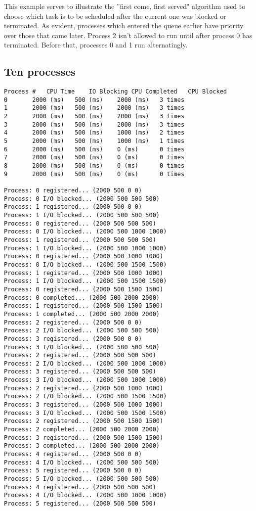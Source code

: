 \documentclass{article}
\begin{document}
	This example serves to illustrate the ''first come, first served" algorithm
	used to choose which task is to be scheduled after the current one was
	blocked or terminated. As evident, processes which entered the queue earlier
	have priority over those that came later. Process 2 isn't allowed to run
	until after process 0 has terminated. Before that, processes 0 and 1 run
	alternatingly.
	
	\subsection{Ten processes}
	
	\begin{verbatim}
Process #	CPU Time	IO Blocking	CPU Completed	CPU Blocked
0		2000 (ms)	500 (ms)	2000 (ms)	3 times
1		2000 (ms)	500 (ms)	2000 (ms)	3 times
2		2000 (ms)	500 (ms)	2000 (ms)	3 times
3		2000 (ms)	500 (ms)	2000 (ms)	3 times
4		2000 (ms)	500 (ms)	1000 (ms)	2 times
5		2000 (ms)	500 (ms)	1000 (ms)	1 times
6		2000 (ms)	500 (ms)	0 (ms)		0 times
7		2000 (ms)	500 (ms)	0 (ms)		0 times
8		2000 (ms)	500 (ms)	0 (ms)		0 times
9		2000 (ms)	500 (ms)	0 (ms)		0 times

Process: 0 registered... (2000 500 0 0)
Process: 0 I/O blocked... (2000 500 500 500)
Process: 1 registered... (2000 500 0 0)
Process: 1 I/O blocked... (2000 500 500 500)
Process: 0 registered... (2000 500 500 500)
Process: 0 I/O blocked... (2000 500 1000 1000)
Process: 1 registered... (2000 500 500 500)
Process: 1 I/O blocked... (2000 500 1000 1000)
Process: 0 registered... (2000 500 1000 1000)
Process: 0 I/O blocked... (2000 500 1500 1500)
Process: 1 registered... (2000 500 1000 1000)
Process: 1 I/O blocked... (2000 500 1500 1500)
Process: 0 registered... (2000 500 1500 1500)
Process: 0 completed... (2000 500 2000 2000)
Process: 1 registered... (2000 500 1500 1500)
Process: 1 completed... (2000 500 2000 2000)
Process: 2 registered... (2000 500 0 0)
Process: 2 I/O blocked... (2000 500 500 500)
Process: 3 registered... (2000 500 0 0)
Process: 3 I/O blocked... (2000 500 500 500)
Process: 2 registered... (2000 500 500 500)
Process: 2 I/O blocked... (2000 500 1000 1000)
Process: 3 registered... (2000 500 500 500)
Process: 3 I/O blocked... (2000 500 1000 1000)
Process: 2 registered... (2000 500 1000 1000)
Process: 2 I/O blocked... (2000 500 1500 1500)
Process: 3 registered... (2000 500 1000 1000)
Process: 3 I/O blocked... (2000 500 1500 1500)
Process: 2 registered... (2000 500 1500 1500)
Process: 2 completed... (2000 500 2000 2000)
Process: 3 registered... (2000 500 1500 1500)
Process: 3 completed... (2000 500 2000 2000)
Process: 4 registered... (2000 500 0 0)
Process: 4 I/O blocked... (2000 500 500 500)
Process: 5 registered... (2000 500 0 0)
Process: 5 I/O blocked... (2000 500 500 500)
Process: 4 registered... (2000 500 500 500)
Process: 4 I/O blocked... (2000 500 1000 1000)
Process: 5 registered... (2000 500 500 500)
    \end{verbatim}
	
\end{document}
